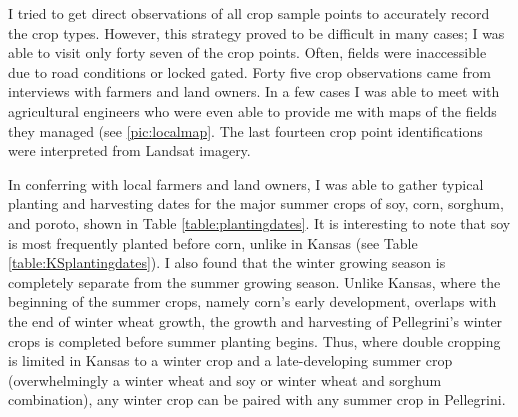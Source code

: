 I tried to get direct observations of all crop sample points to accurately record the crop types. However, this strategy proved to be difficult in many cases; I was able to visit only forty seven of the crop points. Often, fields were inaccessible due to road conditions or locked gated. Forty five crop observations came from interviews with farmers and land owners. In a few cases I was able to meet with agricultural engineers who were even able to provide me with maps of the fields they managed (see \autoref{pic:localmap}. The last fourteen crop point identifications were interpreted from Landsat imagery.

In conferring with local farmers and land owners, I was able to gather typical planting and harvesting dates for the major summer crops of soy, corn, sorghum, and poroto, shown in Table \ref{table:plantingdates}. It is interesting to note that soy is most frequently planted before corn, unlike in Kansas (see Table \ref{table:KSplantingdates}). I also found that the winter growing season is completely separate from the summer growing season. Unlike Kansas, where the beginning of the summer crops, namely corn's early development, overlaps with the end of winter wheat growth, the growth and harvesting of Pellegrini's winter crops is completed before summer planting begins. Thus, where double cropping is limited in Kansas to a winter crop and a late-developing summer crop (overwhelmingly a winter wheat and soy or winter wheat and sorghum combination), any winter crop can be paired with any summer crop in Pellegrini.

